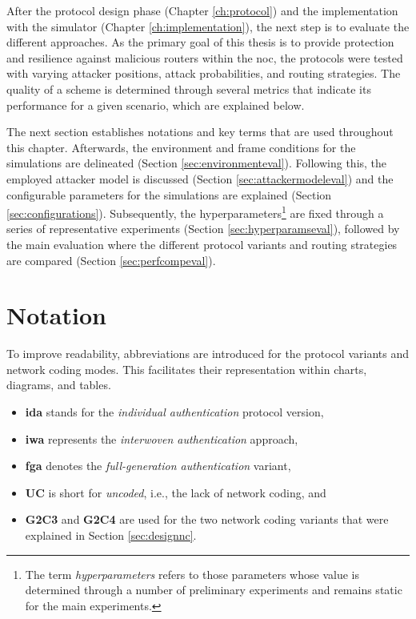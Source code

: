 After the protocol design phase (Chapter \ref{ch:protocol}) and the implementation with the simulator (Chapter \ref{ch:implementation}), the next step
is to evaluate the different approaches. As the primary goal of this thesis is to provide protection and resilience against malicious routers within
the \gls{noc}, the protocols were tested with varying attacker positions, attack probabilities, and routing strategies. The quality of a scheme
is determined through several metrics that indicate its performance for a given scenario, which are explained below.

The next section establishes notations and key terms that are used throughout this chapter. Afterwards, the environment and frame conditions for the
simulations are delineated (Section \ref{sec:environmenteval}). Following this, the employed attacker model is discussed (Section
\ref{sec:attackermodeleval}) and the configurable parameters for the simulations are explained (Section \ref{sec:configurations}). Subsequently,
the hyperparameters\footnote{The term \textit{hyperparameters} refers to those parameters whose value is determined through a number of preliminary
experiments and remains static for the main experiments.} are fixed through a series of representative experiments (Section
\ref{sec:hyperparamseval}), followed by the main evaluation where the different protocol variants and routing strategies are compared (Section
\ref{sec:perfcompeval}).

\section{Notation}\label{sec:notationeval}
To improve readability, abbreviations are introduced for the protocol variants and network coding modes. This facilitates their representation within
charts, diagrams, and tables.
\begin{itemize}
    \item \textbf{\Gls{ida}} stands for the \textit{individual authentication} protocol version,
    \item \textbf{\Gls{iwa}} represents the \textit{interwoven authentication} approach,
    \item \textbf{\Gls{fga}} denotes the \textit{full-generation authentication} variant,
    \item \textbf{UC} is short for \textit{uncoded}, i.e., the lack of network coding, and
    \item \textbf{G2C3} and \textbf{G2C4} are used for the two network coding variants that were explained in Section \ref{sec:designnc}.
\end{itemize}

